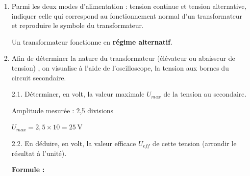 \documentclass[11pt,a4paper]{article}
\begin{document}
\begin{enumerate}
    \item Parmi les deux modes d'alimentation : tension continue et tension alternative, indiquer celle qui correspond au fonctionnement normal d'un transformateur et reproduire le symbole du transformateur. 

\begin{tcolorbox}[colback=red!5!white,colframe=red!75!black]
Un transformateur fonctionne en \textbf{régime alternatif}. 

\end{tcolorbox}


\item Afin de déterminer la nature du transformateur (élévateur ou abaisseur de tension) , on visualise à l'aide de l'oscilloscope, la tension aux bornes du circuit secondaire. 

\noindent%
\begin{minipage}{.55\textwidth}%

    2.1. Déterminer, en volt, la valeur maximale $U_{max}$ de la tension au secondaire. 

\begin{tcolorbox}[colback=red!5!white,colframe=red!75!black]
Amplitude mesurée : 2,5 divisions
\vspace{2mm}

$U_{max} = 2,5 \times 10 = \boxed{25~\text{V}}$
\end{tcolorbox}

    2.2. En déduire, en volt, la valeur efficace $U_{eff}$ de cette tension (arrondir le résultat à l'unité). 

\begin{tcolorbox}[colback=red!5!white,colframe=red!75!black]
\textbf{Formule :}


\end{tcolorbox}
\end{minipage}
\end{enumerate}
\end{document}
